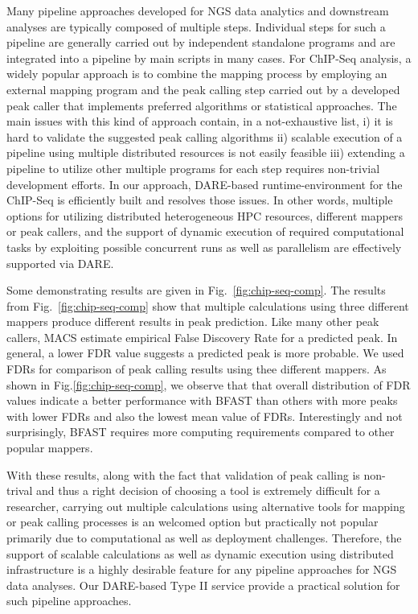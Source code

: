 \documentclass{cpeauth}
\begin{document}
Many pipeline approaches developed for NGS data analytics and downstream analyses are typically composed of multiple steps. Individual steps for such a pipeline are generally carried out by independent standalone programs and are integrated into a pipeline by main scripts in many cases.  For ChIP-Seq analysis, a widely popular approach is to combine the mapping process by employing an external mapping program and the peak calling step carried out by a developed peak caller that implements preferred algorithms or statistical approaches\cite{laajala, macs}.  The main issues with this kind of approach contain, in a not-exhaustive list, i) it is hard to validate the suggested peak calling algorithms ii) scalable execution of a pipeline using multiple distributed resources is not easily feasible iii) extending a pipeline to utilize other multiple programs for each step requires non-trivial development efforts.  In our approach, DARE-based runtime-environment for the ChIP-Seq is efficiently built and resolves those issues.  In other words, multiple options for utilizing distributed heterogeneous HPC resources, different mappers or peak callers, and the support of dynamic execution of required computational tasks by exploiting possible concurrent runs as well as parallelism are effectively supported via DARE.  

Some demonstrating results are given in Fig.~\ref{fig:chip-seq-comp}.   The results from Fig.~\ref{fig:chip-seq-comp} show that multiple calculations using three different mappers produce different results in peak prediction.  Like many other peak callers, MACS estimate empirical False Discovery Rate for a predicted peak. In general, a lower FDR value suggests a predicted peak is more probable.  We used FDRs for comparison of peak calling results using thee different mappers.  As shown in Fig.\ref{fig:chip-seq-comp}, we observe that that overall distribution of FDR values indicate a better performance with BFAST than others with more peaks with lower FDRs and also the lowest mean value of FDRs.  Interestingly and not surprisingly, BFAST requires more computing requirements compared to other popular mappers.  

With these results, along with the fact that validation of peak calling is non-trival and thus a right decision of choosing a tool is extremely difficult for a researcher\cite{laajala}, carrying out multiple calculations using alternative tools for mapping or peak calling processes is an welcomed option but practically not popular primarily due to computational as well as deployment challenges.  Therefore, the support of scalable calculations as well as dynamic execution using distributed infrastructure is a highly desirable feature for any pipeline approaches for NGS data analyses.  Our DARE-based Type II service provide a practical solution for such pipeline approaches. 
\end{document}
